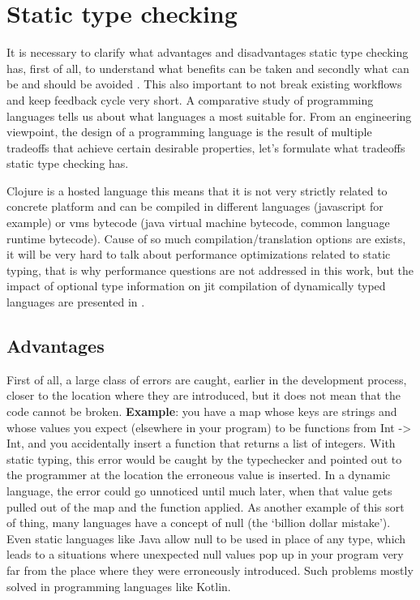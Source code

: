 \section{Static type checking}
\label{sec:statictypechecking}
It is necessary to clarify what advantages and disadvantages static type
checking has, first of all, to understand what benefits can be taken and
secondly what can be and should be avoided \cite{staticvsdynamic}. This also
important to not break existing workflows and keep feedback cycle very short. A
comparative study of programming languages \cite{nanz2015comparative} tells us
about what languages a most suitable for. From an engineering viewpoint, the
design of a programming language is the result of multiple tradeoffs that
achieve certain desirable properties, let's formulate what tradeoffs static type
checking has.

Clojure is a hosted language this means that it is not very strictly related to
concrete platform and can be compiled in different languages (javascript for
example) or vms bytecode (java virtual machine bytecode, common language runtime
bytecode). Cause of so much compilation/translation options are exists, it will
be very hard to talk about performance optimizations related to static typing,
that is why performance questions are not addressed in this work, but the impact
of optional type information on jit compilation of dynamically typed languages
are presented in \cite{chang2011impact}.

\subsection{Advantages}
First of all, a large class of errors are caught, earlier in the development
process, closer to the location where they are introduced, but it does not mean
that the code cannot be broken. \textbf{Example}: you have a map whose keys are
strings and whose values you expect (elsewhere in your program) to be functions
from Int -> Int, and you accidentally insert a function that returns a list of
integers. With static typing, this error would be caught by the typechecker and
pointed out to the programmer at the location the erroneous value is inserted.
In a dynamic language, the error could go unnoticed until much later, when that
value gets pulled out of the map and the function applied. As another example of
this sort of thing, many languages have a concept of null (the ‘billion dollar
mistake’). Even static languages like Java allow null to be used in place of any
type, which leads to a situations where unexpected null values pop up in your
program very far from the place where they were erroneously introduced. Such
problems mostly solved in programming languages like Kotlin.

